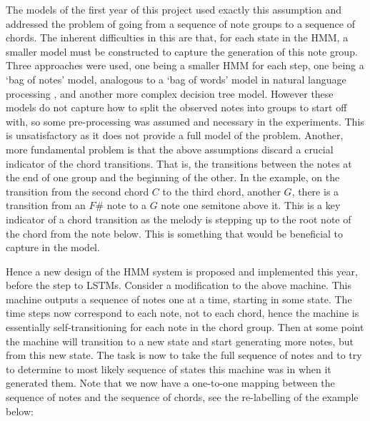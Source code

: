 \documentclass[bsc,singlespacing,logo, parskip, deptreport]{infthesis}
\begin{document}
\begin{center}
\end{center}

The models of the first year of this project used exactly this assumption and addressed the problem of going from a sequence of note groups to a sequence of chords. The inherent difficulties in this are that, for each state in the HMM, a smaller model must be constructed to capture the generation of this note group. Three approaches were used, one being a smaller HMM for each step, one being a `bag of notes' model, analogous to a `bag of words' model in natural language processing \cite{zhang2010understanding}, and another more complex decision tree model. However these models do not capture how to split the observed notes into groups to start off with, so some pre-processing was assumed and necessary in the experiments. This is unsatisfactory as it does not provide a full model of the problem. Another, more fundamental problem is that the above assumptions discard a crucial indicator of the chord transitions. That is, the transitions between the notes at the end of one group and the beginning of the other. In the example, on the transition from the second chord $C$ to the third chord, another $G$, there is a transition from an $F\#$ note to a $G$ note one semitone above it. This is a key indicator of a chord transition as the melody is stepping up to the root note of the chord from the note below. This is something that would be beneficial to capture in the model.

Hence a new design of the HMM system is proposed and implemented this year, before the step to LSTMs. Consider a modification to the above machine. This machine outputs a sequence of notes one at a time, starting in some state. The time steps now correspond to each note, not to each chord, hence the machine is essentially self-transitioning for each note in the chord group. Then at some point the machine will transition to a new state and start generating more notes, but from this new state. The task is now to take the full sequence of notes and to try to determine to most likely sequence of states this machine was in when it generated them. Note that we now have a one-to-one mapping between the sequence of notes and the sequence of chords, see the re-labelling of the example below:
\end{document}
